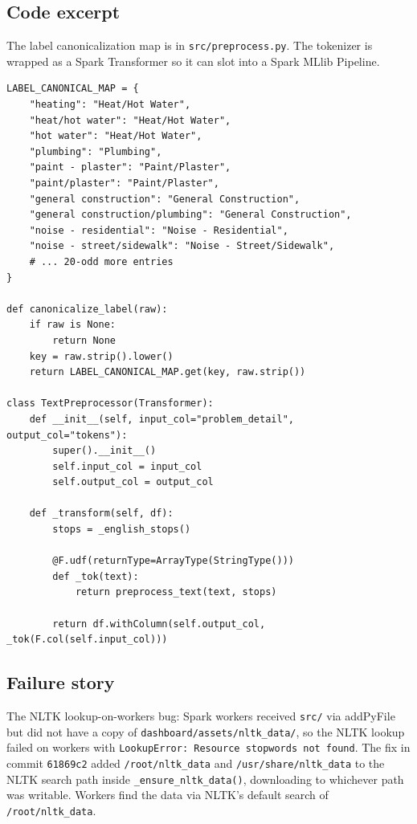 \documentclass[11pt,letterpaper]{book}
\begin{document}
\subsection*{Code excerpt}

The label canonicalization map is in \texttt{src/preprocess.py}. The tokenizer is wrapped as a Spark Transformer so it can slot into a Spark MLlib Pipeline.

\begin{lstlisting}
LABEL_CANONICAL_MAP = {
    "heating": "Heat/Hot Water",
    "heat/hot water": "Heat/Hot Water",
    "hot water": "Heat/Hot Water",
    "plumbing": "Plumbing",
    "paint - plaster": "Paint/Plaster",
    "paint/plaster": "Paint/Plaster",
    "general construction": "General Construction",
    "general construction/plumbing": "General Construction",
    "noise - residential": "Noise - Residential",
    "noise - street/sidewalk": "Noise - Street/Sidewalk",
    # ... 20-odd more entries
}

def canonicalize_label(raw):
    if raw is None:
        return None
    key = raw.strip().lower()
    return LABEL_CANONICAL_MAP.get(key, raw.strip())

class TextPreprocessor(Transformer):
    def __init__(self, input_col="problem_detail", output_col="tokens"):
        super().__init__()
        self.input_col = input_col
        self.output_col = output_col

    def _transform(self, df):
        stops = _english_stops()

        @F.udf(returnType=ArrayType(StringType()))
        def _tok(text):
            return preprocess_text(text, stops)

        return df.withColumn(self.output_col, _tok(F.col(self.input_col)))
\end{lstlisting}

\subsection*{Failure story}

The NLTK lookup-on-workers bug: Spark workers received \texttt{src/} via addPyFile but did not have a copy of \texttt{dashboard/assets/nltk\_data/}, so the NLTK lookup failed on workers with \texttt{LookupError: Resource stopwords not found}. The fix in commit \texttt{61869c2} added \texttt{/root/nltk\_data} and \texttt{/usr/share/nltk\_data} to the NLTK search path inside \texttt{\_ensure\_nltk\_data()}, downloading to whichever path was writable. Workers find the data via NLTK's default search of \texttt{/root/nltk\_data}.
\end{document}
